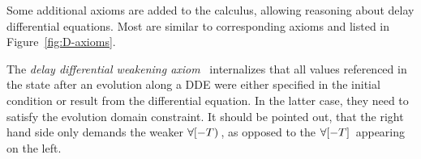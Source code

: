         Some additional axioms are added to the calculus, allowing reasoning about delay differential equations. Most are similar to corresponding \dL axioms and listed in Figure~\ref{fig:D-axioms}.

        The \emph{delay differential weakening axiom}~ internalizes that all values referenced in the state after an  evolution along a DDE were either specified in the initial condition or result from the differential equation. In the latter case, they need to satisfy the evolution domain constraint.
        It should be pointed out, that the right hand side only demands the weaker $\forall [-T){\,}$, as opposed to the $\hsc$ appearing on the left.

        \begin{figure}[t]
            \begin{calculuscollections}{\coloumnwidth}
            \begin{calculus}


\end{calculus}
\end{calculuscollections}
\end{figure}
